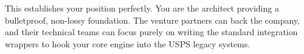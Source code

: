 This establishes your position perfectly. You are the architect providing a bulletproof, non-lossy foundation. The venture partners can back the company, and their technical teams can focus purely on writing the standard integration wrappers to hook your core engine into the USPS legacy systems.

